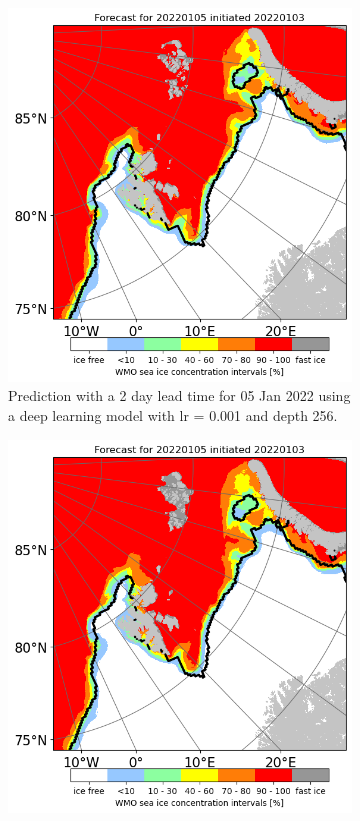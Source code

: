 \documentclass[../main/thesis]{subfiles}
\begin{document}
\begin{figure}
    \centering
    \begin{subfigure}{0.49\textwidth}
        \centering
        \includegraphics[width=\textwidth, trim=85mm 85mm 85mm 50mm, clip]{unet_256_jan}
        \caption{Prediction with a 2 day lead time for 05 Jan 2022 using a deep learning model with lr = 0.001 and depth 256.}
        \label{fig:gs_middle_left}
    \end{subfigure}\hfill
    \begin{subfigure}{0.49\textwidth}
        \centering
        \includegraphics[width=\textwidth, trim=85mm 85mm 85mm 50mm, clip]{unet_1024_jan}

\end{subfigure}
\end{figure}
\end{document}
